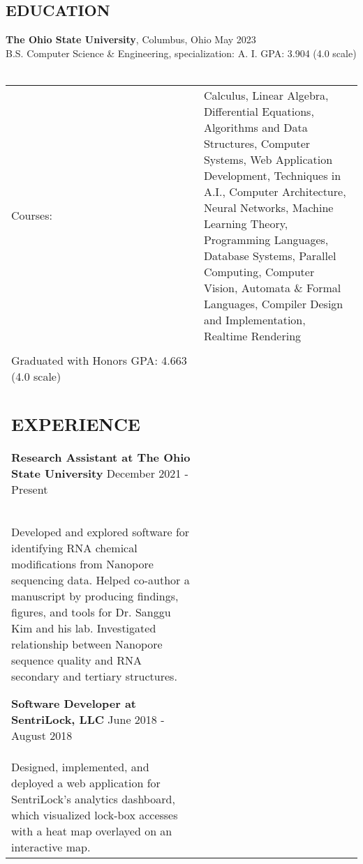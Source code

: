 \documentclass[line, margin]{res}
\begin{document}
\address{manganaris.2@buckeyemail.osu.edu \\ 8590 Saint Ives Place, Cincinnati, Ohio 45255 \\ (513) 432-1399}


\begin{resume}

  \section{EDUCATION}

  \textbf{The Ohio State University}, Columbus, Ohio \hfill May 2023 \\
  B.S. Computer Science \& Engineering, specialization: A. I. \hfill GPA: 3.904 (4.0 scale) \\
  \\
  \begin{tabular*}{\textwidth}{@{}l p{4in}}
    Courses: & Calculus, Linear Algebra, Differential
    Equations, Algorithms and Data Structures, Computer Systems, Web
    Application Development, Techniques in A.I., Computer
    Architecture, Neural Networks, Machine Learning Theory,
    Programming Languages, Database Systems, Parallel Computing,
    Computer Vision, Automata \& Formal Languages, Compiler Design and
    Implementation, Realtime Rendering \\
  \end{tabular}

  \textbf{Anderson High School}, Cincinnati, Ohio \hfill June 2019 \\
  Graduated with Honors \hfill GPA: 4.663 (4.0 scale) \\

  \section{EXPERIENCE}
  \textbf{Research Assistant at The Ohio State University} \hfill December 2021 - Present \\
  Developed and explored software for identifying RNA chemical
  modifications from Nanopore sequencing data. Helped co-author a manuscript by
  producing findings, figures, and tools for Dr. Sanggu Kim and his
  lab. Investigated relationship between Nanopore sequence quality and
  RNA secondary and tertiary structures.

  \textbf{Software Developer at SentriLock, LLC} \hfill June 2018 -
  August 2018 \\ Designed, implemented, and deployed a web application
  for SentriLock's analytics dashboard, which visualized lock-box
  accesses with a heat map overlayed on an interactive map. \\

\end{tabular*}
\end{resume}
\end{document}
